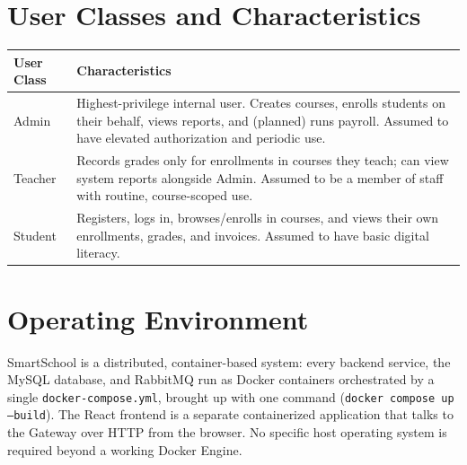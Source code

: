 \documentclass[11pt,a4paper]{report}
\newcommand{\sysname}{SmartSchool}
\begin{document}
\section{User Classes and Characteristics}
\begin{longtable}{L{2.6cm} L{11.4cm}}
\toprule
\textbf{User Class} & \textbf{Characteristics} \\
\midrule
\endhead
Admin & Highest-privilege internal user. Creates courses, enrolls students on their behalf, views reports, and (planned) runs payroll. Assumed to have elevated authorization and periodic use. \\
Teacher & Records grades only for enrollments in courses they teach; can view system reports alongside Admin. Assumed to be a member of staff with routine, course-scoped use. \\
Student & Registers, logs in, browses/enrolls in courses, and views their own enrollments, grades, and invoices. Assumed to have basic digital literacy. \\
\bottomrule
\end{longtable}

\section{Operating Environment}
\sysname{} is a distributed, container-based system: every backend service,
the MySQL database, and RabbitMQ run as Docker containers orchestrated by a
single \texttt{docker-compose.yml}, brought up with one command
(\texttt{docker compose up --build}). The React frontend is a separate
containerized application that talks to the Gateway over HTTP from the
browser. No specific host operating system is required beyond a working
Docker Engine.
\end{document}
